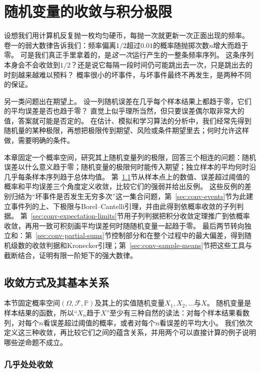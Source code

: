 \chapter{随机变量的收敛与积分极限}
\label{chap:random-variable-convergence}

设想我们用计算机反复抛一枚均匀硬币，每抛一次就更新一次正面出现的频率。
卷一的弱大数律告诉我们：频率偏离$1/2$超过$0.01$的概率随抛掷次数$n$增大而趋于零。
可是我们真正手里拿着的，是\emph{这一次}运行产生的一整条频率序列。
这条序列本身会不会收敛到$1/2$？还是说它每隔一段时间仍可能跳出去一次，只是跳出去的时刻越来越难以预料？
概率很小的坏事件，与坏事件最终不再发生，是两种不同的保证。

另一类问题出在期望上。
设一列随机误差在几乎每个样本结果上都趋于零，它们的平均误差是否也趋于零？
直觉上似乎理所当然，但只要误差偶尔取非常大的值，答案就可能是否定的。
在估计、模拟和学习算法的分析中，我们经常先得到随机量的某种极限，再想把极限传到期望、风险或条件期望里去；何时允许这样做，需要明确的条件。

本章固定一个概率空间，研究其上随机变量列的极限，回答三个相连的问题：随机误差以什么意义趋于零；随机变量的极限何时能传入期望；独立样本的平均何时沿几乎每条样本序列趋于总体均值。
第~\ref{sec:conv-modes}节从样本点上的数值、误差超过阈值的概率和平均误差三个角度定义收敛，比较它们的强弱并给出反例。
这些反例的差别归结为“坏事件是否发生无穷多次”这一集合问题，第~\ref{sec:conv-events}节为此建立事件列的上、下极限与Borel--Cantelli引理，并由此得到依概率收敛的子列判据。
第~\ref{sec:conv-expectation-limits}节用子列判据把积分收敛定理推广到依概率收敛，再用一致可积刻画平均误差何时随随机变量一起趋于零。
最后两节转向独立和：第~\ref{sec:conv-partial-sums}节控制部分和在整个过程中的最大偏差，得到随机级数的收敛判据和Kronecker引理；第~\ref{sec:conv-sample-means}节把这些工具与截断结合，证明有限一阶矩下的强大数律。

\section{收敛方式及其基本关系}
\label{sec:conv-modes}

本节固定概率空间$(\Omega,\mathcal F,\mathbb P)$及其上的实值随机变量$X_1,X_2,\ldots$与$X$。
随机变量是样本结果的函数，所以“$X_n$趋于$X$”至少有三种自然的读法：对每个样本结果看数列，对每个$n$看误差超过阈值的概率，或者对每个$n$看误差的平均大小。
我们依次定义这三种收敛，再比较它们之间的蕴含关系，并用两个可以直接计算的例子说明哪些逆命题不成立。

\subsection{几乎处处收敛}

